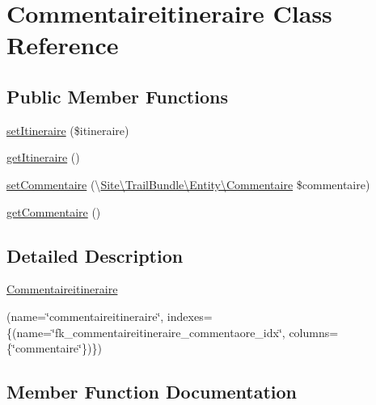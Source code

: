 \hypertarget{class_site_1_1_trail_bundle_1_1_entity_1_1_commentaireitineraire}{}\section{Commentaireitineraire Class Reference}
\label{class_site_1_1_trail_bundle_1_1_entity_1_1_commentaireitineraire}
\subsection*{Public Member Functions}
\begin{DoxyCompactItemize}
\item 
\hyperlink{class_site_1_1_trail_bundle_1_1_entity_1_1_commentaireitineraire_a4ad3e7960ba798a7fb265113fc7546e2}{set\+Itineraire} (\$itineraire)
\item 
\hyperlink{class_site_1_1_trail_bundle_1_1_entity_1_1_commentaireitineraire_adc927913c98f057043d24a992886fb59}{get\+Itineraire} ()
\item 
\hyperlink{class_site_1_1_trail_bundle_1_1_entity_1_1_commentaireitineraire_aa5174bad49d5b79e2fc44703a4fd60f3}{set\+Commentaire} (\textbackslash{}\hyperlink{class_site_1_1_trail_bundle_1_1_entity_1_1_commentaire}{Site\textbackslash{}\+Trail\+Bundle\textbackslash{}\+Entity\textbackslash{}\+Commentaire} \$commentaire)
\item 
\hyperlink{class_site_1_1_trail_bundle_1_1_entity_1_1_commentaireitineraire_ad434d728410f08f8ac0e590ec38fb105}{get\+Commentaire} ()
\end{DoxyCompactItemize}


\subsection{Detailed Description}
\hyperlink{class_site_1_1_trail_bundle_1_1_entity_1_1_commentaireitineraire}{Commentaireitineraire}

(name=\char`\"{}commentaireitineraire\char`\"{}, indexes=\{(name=\char`\"{}fk\+\_\+commentaireitineraire\+\_\+commentaore\+\_\+idx\char`\"{}, columns=\{\char`\"{}commentaire\char`\"{}\})\})  

\subsection{Member Function Documentation}
\hypertarget{class_site_1_1_trail_bundle_1_1_entity_1_1_commentaireitineraire_ad434d728410f08f8ac0e590ec38fb105}{}
